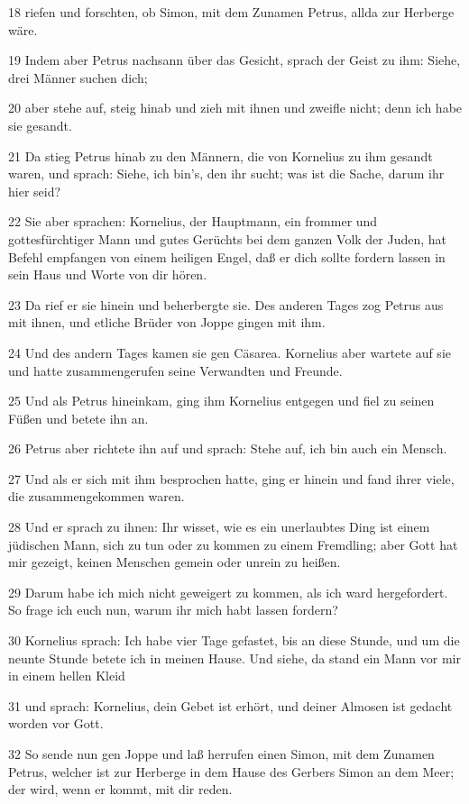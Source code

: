 \par 18 riefen und forschten, ob Simon, mit dem Zunamen Petrus, allda zur Herberge wäre.
\par 19 Indem aber Petrus nachsann über das Gesicht, sprach der Geist zu ihm: Siehe, drei Männer suchen dich;
\par 20 aber stehe auf, steig hinab und zieh mit ihnen und zweifle nicht; denn ich habe sie gesandt.
\par 21 Da stieg Petrus hinab zu den Männern, die von Kornelius zu ihm gesandt waren, und sprach: Siehe, ich bin's, den ihr sucht; was ist die Sache, darum ihr hier seid?
\par 22 Sie aber sprachen: Kornelius, der Hauptmann, ein frommer und gottesfürchtiger Mann und gutes Gerüchts bei dem ganzen Volk der Juden, hat Befehl empfangen von einem heiligen Engel, daß er dich sollte fordern lassen in sein Haus und Worte von dir hören.
\par 23 Da rief er sie hinein und beherbergte sie. Des anderen Tages zog Petrus aus mit ihnen, und etliche Brüder von Joppe gingen mit ihm.
\par 24 Und des andern Tages kamen sie gen Cäsarea. Kornelius aber wartete auf sie und hatte zusammengerufen seine Verwandten und Freunde.
\par 25 Und als Petrus hineinkam, ging ihm Kornelius entgegen und fiel zu seinen Füßen und betete ihn an.
\par 26 Petrus aber richtete ihn auf und sprach: Stehe auf, ich bin auch ein Mensch.
\par 27 Und als er sich mit ihm besprochen hatte, ging er hinein und fand ihrer viele, die zusammengekommen waren.
\par 28 Und er sprach zu ihnen: Ihr wisset, wie es ein unerlaubtes Ding ist einem jüdischen Mann, sich zu tun oder zu kommen zu einem Fremdling; aber Gott hat mir gezeigt, keinen Menschen gemein oder unrein zu heißen.
\par 29 Darum habe ich mich nicht geweigert zu kommen, als ich ward hergefordert. So frage ich euch nun, warum ihr mich habt lassen fordern?
\par 30 Kornelius sprach: Ich habe vier Tage gefastet, bis an diese Stunde, und um die neunte Stunde betete ich in meinen Hause. Und siehe, da stand ein Mann vor mir in einem hellen Kleid
\par 31 und sprach: Kornelius, dein Gebet ist erhört, und deiner Almosen ist gedacht worden vor Gott.
\par 32 So sende nun gen Joppe und laß herrufen einen Simon, mit dem Zunamen Petrus, welcher ist zur Herberge in dem Hause des Gerbers Simon an dem Meer; der wird, wenn er kommt, mit dir reden.
